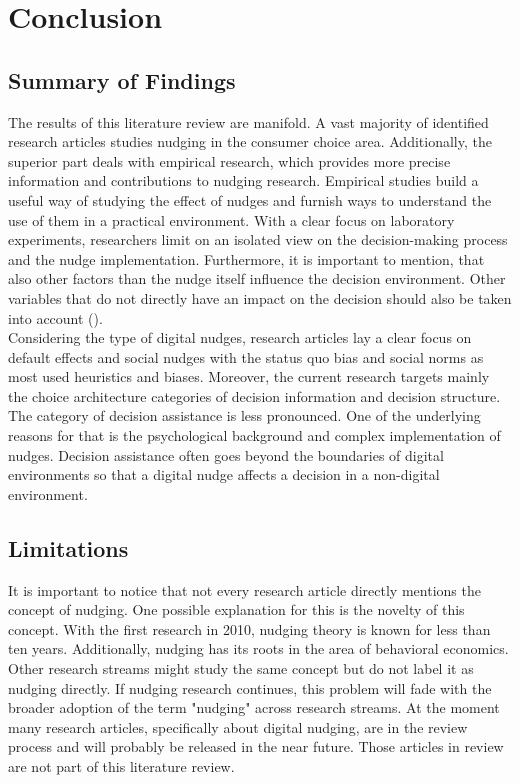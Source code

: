 \section{Conclusion}

 \subsection{Summary of Findings}
The results of this literature review are manifold. A vast majority of identified research articles studies nudging in the consumer choice area. Additionally, the superior part deals with empirical research, which provides more precise information and contributions to nudging research. Empirical studies build a useful way of studying the effect of nudges and furnish ways to understand the use of them in a practical environment. With a clear focus on laboratory experiments, researchers limit on an isolated view on the decision-making process and the nudge implementation. Furthermore, it is important to mention, that also other factors than the nudge itself influence the decision environment. Other variables that do not directly have an impact on the decision should also be taken into account (\cite{biswas_shining_2017}).
\\

Considering the type of digital nudges, research articles lay a clear focus on default effects and social nudges with the status quo bias and social norms as most used heuristics and biases. Moreover, the current research targets mainly the choice architecture categories of decision information and decision structure. The category of decision assistance is less pronounced. One of the underlying reasons for that is the psychological background and complex implementation of nudges. Decision assistance often goes beyond the boundaries of digital environments so that a digital nudge affects a decision in a non-digital environment. 
 
\subsection{Limitations}
It is important to notice that not every research article directly mentions the concept of nudging. One possible explanation for this is the novelty of this concept. With the first research in 2010, nudging theory is known for less than ten years. Additionally, nudging has its roots in the area of behavioral economics. Other research streams might study the same concept but do not label it as nudging directly. If nudging research continues, this problem will fade with the broader adoption of the term "nudging" across research streams. At the moment many research articles, specifically about digital nudging, are in the review process and will probably be released in the near future. Those articles in review are not part of this literature review.
\\

